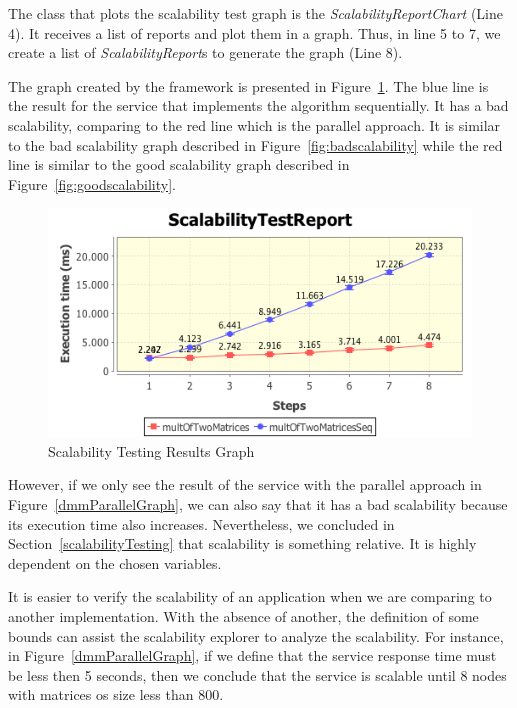 The class that plots the scalability test graph is the \emph{ScalabilityReportChart} (Line 4). It receives a list of reports and plot them in a graph. Thus, in line 5 to 7, we create a list of \emph{ScalabilityReport}s to generate the graph (Line 8).

The graph created by the framework is presented in Figure~\ref{dmmGraph}. The blue line is the result for the service that implements the algorithm sequentially. It has a bad scalability, comparing to the red line which is the parallel approach. It is similar to the bad scalability graph described in Figure~\ref{fig:badscalability} while the red line is similar to the good scalability graph described in Figure~\ref{fig:goodscalability}.

\begin{figure}[htbp]
\begin{center}
	\includegraphics[scale=0.8]{images/twoTestsReportLinear8}
\caption{Scalability Testing Results Graph}
\label{dmmGraph}
\end{center}
\end{figure}

However, if we only see the result of the service with the parallel approach in Figure~\ref{dmmParallelGraph}, we can also say that it has a bad scalability because its execution time also increases. Nevertheless, we concluded in Section~\ref{scalabilityTesting} that scalability is something relative. It is highly dependent on the chosen variables. 

It is easier to verify the scalability of an application when we are comparing to another implementation. With the absence of another, the definition of some bounds can assist the scalability explorer to analyze the scalability. For instance, in Figure~\ref{dmmParallelGraph}, if we define that the service response time must be less then 5 seconds, then we conclude that the service is scalable until 8 nodes with matrices os size less than 800. 

